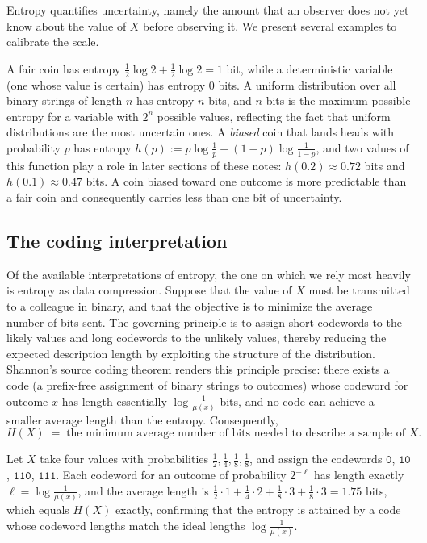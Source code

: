 \documentclass[11pt]{article}
\begin{document}
Entropy quantifies uncertainty, namely the amount that an observer does not yet know about the value of $X$ before observing it. We present several examples to calibrate the scale.

\begin{example}
\label{ex:entropy-calibration}
A fair coin has entropy $\frac12 \log 2 + \frac12 \log 2 = 1$ bit, while a deterministic variable (one whose value is certain) has entropy $0$ bits. A uniform distribution over all binary strings of length $n$ has entropy $n$ bits, and $n$ bits is the maximum possible entropy for a variable with $2^n$ possible values, reflecting the fact that uniform distributions are the most uncertain ones. A \emph{biased} coin that lands heads with probability $p$ has entropy $h(p) := p \log \frac1p + (1-p)\log\frac{1}{1-p}$, and two values of this function play a role in later sections of these notes: $h(0.2) \approx 0.72$ bits and $h(0.1) \approx 0.47$ bits. A coin biased toward one outcome is more predictable than a fair coin and consequently carries less than one bit of uncertainty.
\end{example}

\subsection{The coding interpretation}
\label{sec:coding}

Of the available interpretations of entropy, the one on which we rely most heavily is entropy as data compression. Suppose that the value of $X$ must be transmitted to a colleague in binary, and that the objective is to minimize the average number of bits sent. The governing principle is to assign short codewords to the likely values and long codewords to the unlikely values, thereby reducing the expected description length by exploiting the structure of the distribution. Shannon's source coding theorem renders this principle precise: there exists a code (a prefix-free assignment of binary strings to outcomes) whose codeword for outcome $x$ has length essentially $\log \frac{1}{\mu(x)}$ bits, and no code can achieve a smaller average length than the entropy. Consequently,
\[
H(X) \;=\; \text{the minimum average number of bits needed to describe a sample of } X .
\]

\begin{example}
Let $X$ take four values with probabilities $\frac12, \frac14, \frac18, \frac18$, and assign the codewords $\mathtt{0}$, $\mathtt{10}$, $\mathtt{110}$, $\mathtt{111}$. Each codeword for an outcome of probability $2^{-\ell}$ has length exactly $\ell = \log \frac{1}{\mu(x)}$, and the average length is $\frac12 \cdot 1 + \frac14 \cdot 2 + \frac18 \cdot 3 + \frac18 \cdot 3 = 1.75$ bits, which equals $H(X)$ exactly, confirming that the entropy is attained by a code whose codeword lengths match the ideal lengths $\log \frac{1}{\mu(x)}$.
\end{example}
\end{document}

